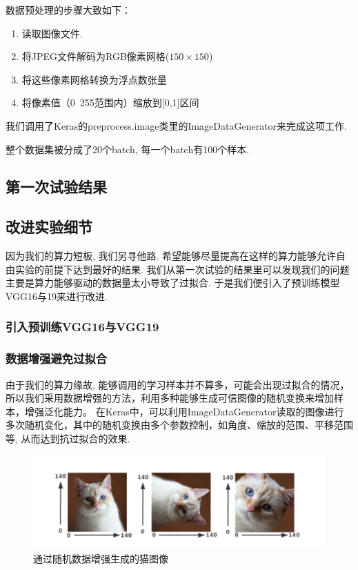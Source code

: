 \documentclass[lang=cn,11pt]{elegantpaper}
\begin{document}
  数据预处理的步骤大致如下：

\begin{enumerate}
	\item 读取图像文件.
	\item 将JPEG文件解码为RGB像素网格($150\times 150$)
	\item 将这些像素网格转换为浮点数张量
	\item 将像素值（0~255范围内）缩放到[0,1]区间
\end{enumerate}

我们调用了Keras的preprocess.image类里的ImageDataGenerator来完成这项工作.

整个数据集被分成了20个batch, 每一个batch有100个样本.

\subsection{第一次试验结果}


\subsection{改进实验细节}

因为我们的算力短板, 我们另寻他路. 希望能够尽量提高在这样的算力能够允许自由实验的前提下达到最好的结果. 我们从第一次试验的结果里可以发现我们的问题主要是算力能够驱动的数据量太小导致了过拟合. 于是我们便引入了预训练模型VGG16与19来进行改进.


\subsubsection{引入预训练VGG16与VGG19}




\subsubsection{数据增强避免过拟合}
由于我们的算力缘故, 能够调用的学习样本并不算多，可能会出现过拟合的情况，所以我们采用数据增强的方法，利用多种能够生成可信图像的随机变换来增加样本，增强泛化能力。 在Keras中，可以利用ImageDataGenerator读取的图像进行多次随机变化，其中的随机变换由多个参数控制，如角度、缩放的范围、平移范围等, 从而达到抗过拟合的效果.

\begin{figure}[hbtp]
\centering
  \includegraphics{aug.png}
  \caption{通过随机数据增强生成的猫图像\label{fig:augcat}}
\end{figure}
\end{document}
